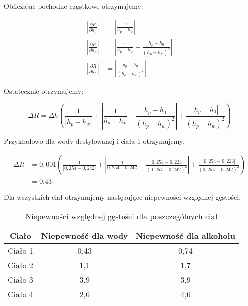 \documentclass[a4paper,12pt]{article}
\begin{document}
Obliczając pochodne cząstkowe otrzymujemy:

\begin{align*}
    \left | \frac{\partial R}{\partial h_0} \right | & = \left | \frac{-1}{h_p - h_w} \right |                                  \\
    \left | \frac{\partial R}{\partial h_p} \right | & = \left | \frac{1}{h_p - h_w} - \frac{h_p - h_0}{(h_p - h_w)^2} \right | \\
    \left | \frac{\partial R}{\partial h_w} \right | & = \left | \frac{h_p - h_0}{(h_p - h_w)^2} \right |
\end{align*}

Ostatecznie otrzymujemy:

\begin{equation}
    \Delta R = \Delta h \left(
    \frac{1}{|h_p - h_w|}
    + \left| \frac{1}{h_p - h_w} - \frac{h_p - h_0}{(h_p - h_w)^2} \right|
    + \frac{|h_p - h_0|}{(h_p - h_w)^2}
    \right)
\end{equation}

Przykładowo dla wody destylowanej i ciała 1 otrzymujemy:

\begin{align*}
    \Delta R & = 0{,}001 \left(
    \frac{1}{|0{,}254 - 0{,}242|}
    + \left| \frac{1}{0{,}254 - 0{,}242} - \frac{0{,}254 - 0{,}223}{(0{,}254 - 0{,}242)^2} \right|
    + \frac{|0{,}254 - 0{,}223|}{(0{,}254 - 0{,}242)^2}
    \right)                     \\
             & = 0.43
\end{align*}

Dla wszystkich ciał otrzymujemy następujące niepewności względnej gęstości:
\begin{table}[H]
    \centering
    \begin{tabular}{|c|c|c|}
        \hline
        \textbf{Ciało} & \textbf{Niepewność dla wody} & \textbf{Niepewność dla alkoholu} \\
        \hline
        Ciało 1 & 0{,}43 & 0{,}74 \\
        \hline
        Ciało 2 & 1{,}1 & 1{,}7 \\
        \hline
        Ciało 3 & 3{,}9 & 3{,}9 \\
        \hline
        Ciało 4 & 2{,}6 & 4{,}6 \\
        \hline
    \end{tabular}
    \caption{Niepewności względnej gęstości dla poszczególnych ciał}
    \label{tab:niepewnosci}
\end{table}
\end{document}

